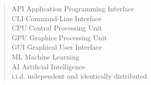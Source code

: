 \clearpage
\renewcommand{\abstractname}{Abbreviations}
\begin{abstract}
{}
    \begin{tabbing}
        API \hspace{3em} \= Application Programming Interface \\
        CLI \> Command-Line Interface \\
        CPU \> Central Processing Unit \\
        GPU \> Graphics Processing Unit \\
        GUI \> Graphical User Interface \\
        ML \> Machine Learning \\
        AI \> Artificial Intelligence \\
        i.i.d. \> independent and identically distributed \\
    \end{tabbing}
\end{abstract}
